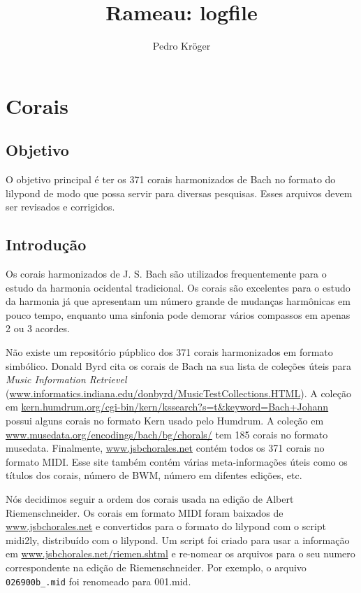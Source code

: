 \documentclass[12pt,brazil]{book}
\title{Rameau: logfile}
\author{Pedro Kröger}
\begin{document}
\graphicspath{{figs/}}

\maketitle

\chapter{Corais}
\label{chap:corais}

\section{Objetivo}
\label{sec:objetivo}

O objetivo principal é ter os 371 corais harmonizados de Bach no
formato do lilypond de modo que possa servir para diversas pesquisas.
Esses arquivos devem ser revisados e corrigidos.

\section{Introdução}
\label{sec:introducao}

Os corais harmonizados de J. S. Bach são utilizados frequentemente
para o estudo da harmonia ocidental tradicional. Os corais são
excelentes para o estudo da harmonia já que apresentam um número
grande de mudanças harmônicas em pouco tempo, enquanto uma sinfonia
pode demorar vários compassos em apenas 2 ou 3 acordes.

Não existe um repositório púpblico dos 371 corais harmonizados em
formato simbólico. Donald Byrd cita os corais de Bach na sua lista de
coleções úteis para \textit{Music Information Retrievel}
(\url{www.informatics.indiana.edu/donbyrd/MusicTestCollections.HTML}).
A coleção em
\url{kern.humdrum.org/cgi-bin/kern/kssearch?s=t&keyword=Bach+Johann}
possui alguns corais no formato Kern usado pelo Humdrum. A coleção em
\url{www.musedata.org/encodings/bach/bg/chorals/} tem 185 corais no
formato musedata. Finalmente, \url{www.jsbchorales.net} contém todos
os 371 corais no formato MIDI. Esse site também contém várias
meta-informações úteis como os títulos dos corais, número de BWM,
número em difentes edições, etc.

Nós decidimos seguir a ordem dos corais usada na edição de Albert
Riemenschneider. Os corais em formato MIDI foram baixados de
\url{www.jsbchorales.net} e convertidos para o formato do lilypond com
o script midi2ly, distribuído com o lilypond. Um script foi criado
para usar a informação em \url{www.jsbchorales.net/riemen.shtml} e
re-nomear os arquivos para o seu numero correspondente na edição de
Riemenschneider. Por exemplo, o arquivo \texttt{026900b\_.mid} foi
renomeado para 001.mid.
\end{document}
